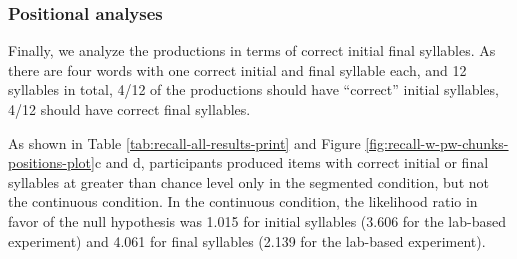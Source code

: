 \documentclass[
]{article}
\begin{document}
\hypertarget{positional-analyses}{%
\subsubsection{Positional analyses}\label{positional-analyses}}

Finally, we analyze the productions in terms of correct initial final
syllables. As there are four words with one correct initial and final
syllable each, and 12 syllables in total, 4/12 of the productions should
have ``correct'' initial syllables, 4/12 should have correct final
syllables.

As shown in Table \ref{tab:recall-all-results-print} and Figure
\ref{fig:recall-w-pw-chunks-positions-plot}c and d, participants
produced items with correct initial or final syllables at greater than
chance level only in the segmented condition, but not the continuous
condition. In the continuous condition, the likelihood ratio in favor of
the null hypothesis was 1.015 for initial syllables (3.606 for the
lab-based experiment) and 4.061 for final syllables (2.139 for the
lab-based experiment).
\end{document}

